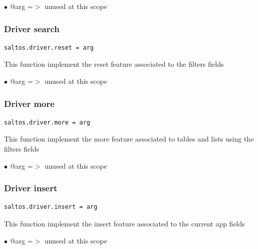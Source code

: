 \documentclass[a4paper]{article}
\begin{document}
\begin{compactitem}
\item[\color{myblue}$\bullet$] @arg =$>$ unused at this scope
\end{compactitem}

\hypertarget{toc173}{}
\subsubsection{Driver search}

\begin{lstlisting}
saltos.driver.reset = arg
\end{lstlisting}

This function implement the reset feature associated to the filters fields

\begin{compactitem}
\item[\color{myblue}$\bullet$] @arg =$>$ unused at this scope
\end{compactitem}

\hypertarget{toc174}{}
\subsubsection{Driver more}

\begin{lstlisting}
saltos.driver.more = arg
\end{lstlisting}

This function implement the more feature associated to tables and lists
using the filters fields

\begin{compactitem}
\item[\color{myblue}$\bullet$] @arg =$>$ unused at this scope
\end{compactitem}

\hypertarget{toc175}{}
\subsubsection{Driver insert}

\begin{lstlisting}
saltos.driver.insert = arg
\end{lstlisting}

This function implement the insert feature associated to the current app fields

\begin{compactitem}
\item[\color{myblue}$\bullet$] @arg =$>$ unused at this scope
\end{compactitem}
\end{document}
